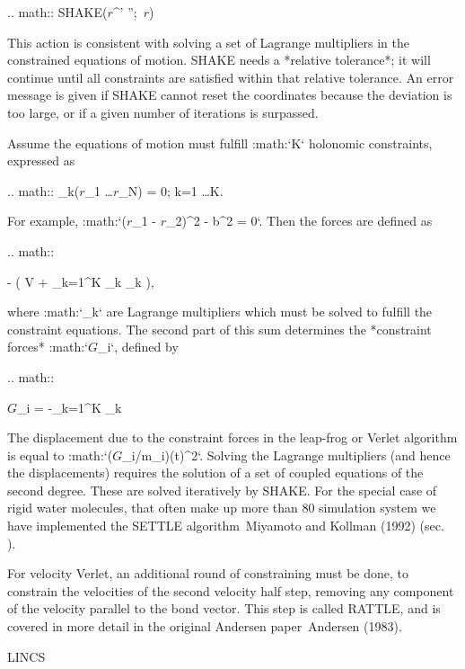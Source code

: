 .. math:: {\rm SHAKE}({\mbox{\boldmath ${r}$}}^{'} '';\, {\mbox{\boldmath ${r}$}})

This action is consistent with solving a set of Lagrange multipliers in
the constrained equations of motion. SHAKE needs a *relative tolerance*;
it will continue until all constraints are satisfied within that
relative tolerance. An error message is given if SHAKE cannot reset the
coordinates because the deviation is too large, or if a given number of
iterations is surpassed.

Assume the equations of motion must fulfill :math:`K` holonomic
constraints, expressed as

.. math:: \sigma_k({\mbox{\boldmath ${r}$}}_1 \ldots {\mbox{\boldmath ${r}$}}_N) = 0; \;\; k=1 \ldots K.

For example,
:math:`({\mbox{\boldmath ${r}$}}_1 - {\mbox{\boldmath ${r}$}}_2)^2 - b^2 = 0`.
Then the forces are defined as

.. math::

   -  \left( V + \sum_{k=1}^K \lambda_k
   \sigma_k \right),

where :math:`\lambda_k` are Lagrange multipliers which must be solved
to fulfill the constraint equations. The second part of this sum
determines the *constraint forces* :math:`{\mbox{\boldmath ${G}$}}_i`,
defined by

.. math::

   {\mbox{\boldmath ${G}$}}_i = -\sum_{k=1}^K \lambda_k 

The displacement due to the constraint forces in the leap-frog or
Verlet algorithm is equal to
:math:`({\mbox{\boldmath ${G}$}}_i/m_i)({{\Delta t}})^2`. Solving the
Lagrange multipliers (and hence the displacements) requires the solution
of a set of coupled equations of the second degree. These are solved
iteratively by SHAKE.
For the special
case of rigid water molecules, that often make up more than 80%
simulation system we have implemented the
SETTLE
algorithm Miyamoto and Kollman (1992)
(sec. 
).

For velocity Verlet, an additional round of constraining must be done,
to constrain the velocities of the second velocity half step, removing
any component of the velocity parallel to the bond vector. This step is
called RATTLE, and is covered in more detail in the original Andersen
paper Andersen (1983).

LINCS
~~~~~

